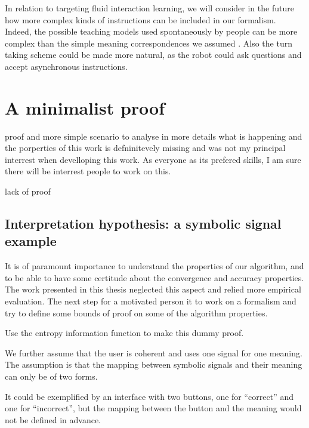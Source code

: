 In relation to targeting fluid interaction learning, we will consider in the future how more complex kinds of instructions can be included in our formalism. Indeed, the possible teaching models used spontaneously by people can be more complex than the simple meaning correspondences we assumed \cite{thomaz2008teachable,Cakmak2010optimality}. Also the turn taking scheme could be made more natural, as the robot could ask questions \cite{cakmak2012designing} and accept asynchronous instructions.


\section{A minimalist proof}
\label{chapter:limitations:proof}

proof and more simple scenario to analyse in more details what is happening and the porperties of this work is defninitevely missing and was not my principal interrest when develloping this work. As everyone as its prefered skills, I am sure there will be interrest people to work on this.

lack of proof

\subsection{Interpretation hypothesis: a symbolic signal example}

It is of paramount importance to understand the properties of our algorithm, and to be able to have some certitude about the convergence and accuracy properties. The work presented in this thesis neglected this aspect and relied more empirical evaluation. The next step for a motivated person it to work on a formalism and try to define some bounds of proof on some of the algorithm properties.

Use the entropy information function to make this dummy proof.

We further assume that the user is coherent and uses one signal for one meaning. The assumption is that the mapping between symbolic signals and their meaning can only be of two forms.

It could be exemplified by an interface with two buttons, one for ``correct'' and one for ``incorrect'', but the mapping between the button and the meaning would not be defined in advance.

